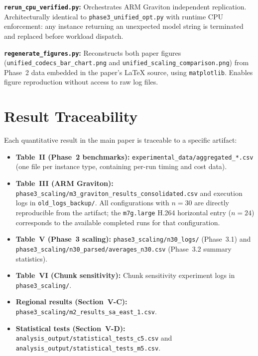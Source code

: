 \documentclass[conference]{IEEEtran}
\begin{document}
\textbf{\texttt{rerun\_cpu\_verified.py}:}
Orchestrates ARM Graviton independent replication. Architecturally identical to
\texttt{phase3\_unified\_opt.py} with runtime CPU enforcement: any instance
returning an unexpected model string is terminated and replaced before workload
dispatch.

\textbf{\texttt{regenerate\_figures.py}:}
Reconstructs both paper figures (\texttt{unified\_codecs\_bar\_chart.png} and
\texttt{unified\_scaling\_comparison.png}) from Phase~2 data embedded in the
paper's LaTeX source, using \texttt{matplotlib}. Enables figure reproduction
without access to raw log files.

\section{Result Traceability}
\label{app:validation}

Each quantitative result in the main paper is traceable to a specific artifact:

\begin{itemize}
  \item \textbf{Table~II (Phase~2 benchmarks):}
        \texttt{experimental\_data/aggregated\_*.csv} (one file per instance type,
        containing per-run timing and cost data).
  \item \textbf{Table~III (ARM Graviton):}
        \texttt{phase3\_scaling/m3\_graviton\_results\_consolidated.csv}
        and execution logs in \texttt{old\_logs\_backup/}. All configurations
        with $n=30$ are directly reproducible from the artifact; the
        \texttt{m7g.large} H.264 horizontal entry ($n=24$) corresponds to
        the available completed runs for that configuration.
  \item \textbf{Table~V (Phase~3 scaling):}
        \texttt{phase3\_scaling/n30\_logs/} (Phase~3.1) and
        \texttt{phase3\_scaling/n30\_parsed/averages\_n30.csv} (Phase~3.2
        summary statistics).
  \item \textbf{Table~VI (Chunk sensitivity):}
        Chunk sensitivity experiment logs in \texttt{phase3\_scaling/}.
  \item \textbf{Regional results (Section~V-C):}
        \texttt{phase3\_scaling/m2\_results\_sa\_east\_1.csv}.
  \item \textbf{Statistical tests (Section~V-D):}
        \texttt{analysis\_output/statistical\_tests\_c5.csv} and
        \texttt{analysis\_output/statistical\_tests\_m5.csv}.
\end{itemize}
\end{document}
